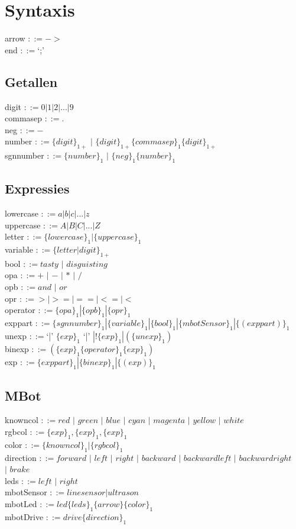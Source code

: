 \documentclass[12pt,a4paper]{report}
\begin{document}
\chapter{Syntaxis}
arrow $::= ->$\\
end $::= $`;'\\
\section{Getallen}
digit $::= 0|1|2|...|9$\\
commasep $::= .$\\
neg $::= -$\\
number $::= \{digit\}_{1+}$ $|$ $\{digit\}_{1+}\{commasep\}_{1}\{digit\}_{1+}$\\
sgnnumber $::= \{number\}_{1}$ $|$ $\{neg\}_{1}\{number\}_{1}$\\

\section{Expressies}
lowercase $::= a|b|c|...|z$\\
uppercase $::= A|B|C|...|Z$\\
letter $::= \{lowercase\}_{1} | \{uppercase\}_{1}$\\
variable $::= \{letter|digit\}_{1+}$\\
bool $::= tasty$ $|$ $disguisting$\\
opa $::= +$ $|$ $-$ $|$ $*$ $|$ $/$\\
opb $::= and$ $|$ $or$\\
opr $::= >|>=|==|<=|<$\\
operator $::= \{opa\}_{1} | \{opb\}_{1} | \{opr\}_{1}$\\
exppart $::= \{sgnnumber\}_{1} | \{variable\}_{1} | \{bool\}_{1} | \{mbotSensor\}_{1} | \{(exppart)\}_{1}$\\
unexp $::= $`|' $\{exp\}_{1}$ `|' $| !\{exp\}_{1} | (\{unexp\}_{1})$\\
binexp $::= (\{exp\}_{1} \{operator\}_{1} \{exp\}_{1})$\\
exp $::= \{exppart\}_{1} | \{binexp\}_{1} | \{(exp)\}_{1}$\\

\section{MBot}
knowncol $::= red$ $|$ $green$ $|$ $blue$ $|$ $cyan$ $|$ $magenta$ $|$ $yellow$ $|$ $white$\\
rgbcol $::= \{exp\}_{1}, \{exp\}_{1}, \{exp\}_{1}$\\
color $::= \{knowncol\}_{1} | \{rgbcol\}_{1}$\\
direction $::= forward$ $|$ $left$ $|$ $right$ $|$ $backward$ $|$ $backwardleft$ $|$ $backwardright$ \\
\indent\indent\indent$|$ $brake$\\
leds $::= left$ $|$ $right$\\
mbotSensor $::= linesensor | ultrason$\\
mbotLed $::= led \{leds\}_{1} \{arrow\} \{color\}_{1} $\\
mbotDrive $::= drive \{direction\}_{1}$\\
\end{document}

